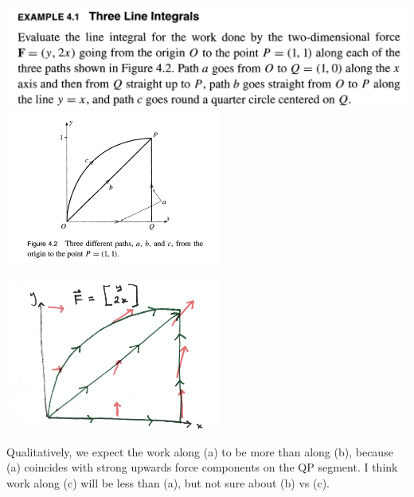   %

\begin{mdframed}
  \includegraphics[width=400pt]{img/physics--classical-mechanics--taylor--ex-4-1.png}\\
  \includegraphics[width=200pt]{img/physics--classical-mechanics--taylor--ex-4-1-diag.png}
\end{mdframed}
\begin{mdframed}
  \includegraphics[width=200pt]{img/physics--classical-mechanics--taylor--ex-4-1-diag-2.png}
\end{mdframed}
Qualitatively, we expect the work along (a) to be more than along (b), because (a) coincides with
strong upwards force components on the QP segment. I think work along (c) will be less than (a), but
not sure about (b) vs (c).

